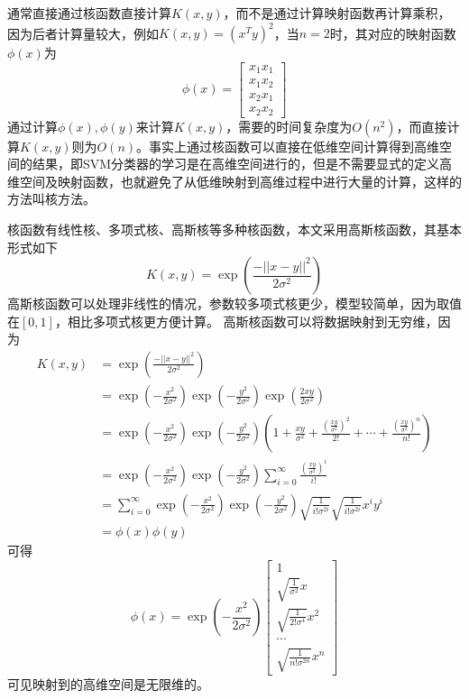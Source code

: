 \documentclass[supercite]{upcthesis}
\begin{document}
通常直接通过核函数直接计算$K(x,y)$，而不是通过计算映射函数再计算乘积，因为后者计算量较大，例如$K(x,y)=(x^Ty)^2$，当$n=2$时，其对应的映射函数$\phi(x)$为
\begin{equation}
\phi(x)=
\left[\begin{array}{c}
x_1x_1\\
x_1x_2\\
x_2x_1\\
x_2x_2
\end{array}
\right]
\end{equation}
通过计算$\phi(x),\phi(y)$来计算$K(x,y)$，需要的时间复杂度为$O(n^2)$，而直接计算$K(x,y)$则为$O(n)$。事实上通过核函数可以直接在低维空间计算得到高维空间的结果，即SVM分类器的学习是在高维空间进行的，但是不需要显式的定义高维空间及映射函数，也就避免了从低维映射到高维过程中进行大量的计算，这样的方法叫核方法。

核函数有线性核、多项式核、高斯核等多种核函数，本文采用高斯核函数，其基本形式如下
\begin{equation}
K(x,y)=\exp(\frac{-||x-y||^2}{2\sigma^2})
\end{equation}
高斯核函数可以处理非线性的情况，参数较多项式核更少，模型较简单，因为取值在$[0,1]$，相比多项式核更方便计算。
高斯核函数可以将数据映射到无穷维，因为
\begin{equation}
\begin{aligned}
K(x,y)&=\exp(\frac{-||x-y||^2}{2\sigma^2})\\
&=\exp(-\frac{x^2}{2\sigma^2})\exp(-\frac{y^2}{2\sigma^2})\exp(\frac{2xy}{2\sigma^2})\\
&=\exp(-\frac{x^2}{2\sigma^2})\exp(-\frac{y^2}{2\sigma^2})(1+\frac{xy}{\sigma^2}+\frac{(\frac{xy}{\sigma^2})^2}{2!}+\cdots+\frac{(\frac{xy}{\sigma^2})^n}{n!})\\
&=\exp(-\frac{x^2}{2\sigma^2})\exp(-\frac{y^2}{2\sigma^2})\sum_{i=0}^{\infty}\frac{(\frac{xy}{\sigma^2})^i}{i!}\\
&=\sum_{i=0}^{\infty}\exp(-\frac{x^2}{2\sigma^2})\exp(-\frac{y^2}{2\sigma^2})\sqrt{\frac{1}{i!\sigma^{2i}}}\sqrt{\frac{1}{i!\sigma^{2i}}}x^i y^i\\
&=\phi(x)\phi(y)
\end{aligned}
\end{equation}
可得
\begin{equation}
\phi(x)=\exp(-\frac{x^2}{2\sigma^2})
\left[\begin{array}{c}
1\\
\sqrt{\frac{1}{\sigma^2}}x\\
\sqrt{\frac{1}{2!\sigma^4}}x^2\\
\cdots\\
\sqrt{\frac{1}{n!\sigma^{2n}}}x^n
\end{array}
\right]
\end{equation}
可见映射到的高维空间是无限维的。
\end{document}

